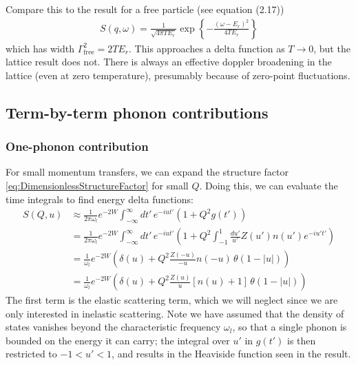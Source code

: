 \documentclass{article}
\begin{document}
Compare this to the result for a free particle (see \cite{impulse} equation (2.17))
\begin{align}
S(q, \omega) = \frac{1}{\sqrt{4 \pi T E_r}} \exp \left\{ -\frac{(\omega - E_r)^2}{4 TE_r} \right\}
\end{align}
which has width $\Gamma_\text{free}^2 = 2 TE_r$. This approaches a delta function as $T\to 0$, but the lattice result does not. There is always an effective doppler broadening in the lattice (even at zero temperature), presumably because of zero-point fluctuations.

\subsection{Term-by-term phonon contributions}

\subsubsection{One-phonon contribution}

For small momentum transfers, we can expand the structure factor \eqref{eq:DimensionlessStructureFactor} for small $Q$. Doing this, we can evaluate the time integrals to find energy delta functions:
\begin{align}
S(Q, u) &\approx \frac{1}{2 \pi \omega_l} e^{-2 W} \int_{-\infty}^\infty dt'\, e^{-iut'} (1 + Q^2 g(t')) \nonumber\\
   &= \frac{1}{2 \pi \omega_l} e^{-2 W} \int_{-\infty}^\infty dt'\, e^{-iut'} \left( 1 + Q^2 \int_{-1}^1 \frac{du'}{u'}Z(u')n(u')e^{-iu't'} \right) \nonumber\\
   &= \frac{1}{\omega_l} e^{-2 W} \left( \delta(u) + Q^2 \frac{Z(-u)}{-u}n(-u)\,\theta(1-|u|) \right) \nonumber\\
   &= \frac{1}{\omega_l} e^{-2 W} \left( \delta(u) + Q^2 \frac{Z(u)}{u}[n(u) + 1]\,\theta(1-|u|) \right)
\end{align}
The first term is the elastic scattering term, which we will neglect since we are only interested in inelastic scattering. Note we have assumed that the density of states vanishes beyond the characteristic frequency $\omega_l$, so that a single phonon is bounded on the energy it can carry; the integral over $u'$ in $g(t')$ is then restricted to $-1 < u' < 1$, and results in the Heaviside function seen in the result.
\end{document}
